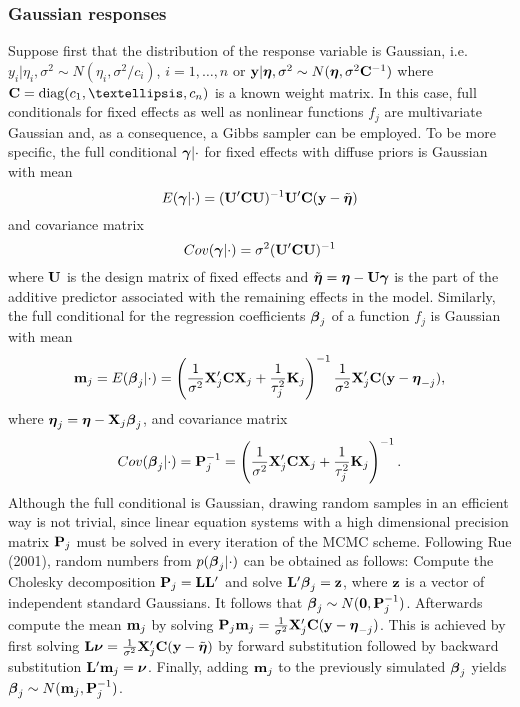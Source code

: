 \documentclass[11pt,a4paper,twoside]{bayesxarticle}
\begin{document}
\subsubsection{Gaussian responses}
\label{gaussianresp}

Suppose first that the distribution of the response variable is
Gaussian, i.e. $y_i | \eta_i, \sigma^2 \sim N(\eta_i,\sigma^2/c_i)$,
$i=1,\dots,n$ or $\mathbf{y} | \boldsymbol{\eta}, \sigma^2 \sim N(\boldsymbol{\eta},\sigma^2 \mathbf{C}^{-1})$
where $\Cvec = \diag(c_1,\dots,c_n)$ is a known weight matrix. In this
case, full conditionals for fixed effects as well as nonlinear
functions $f_j$ are multivariate Gaussian and, as a consequence, a
Gibbs sampler can be employed. To be more specific, the full
conditional $\boldsymbol{\gamma} | \cdot$ for fixed effects with diffuse priors
is Gaussian with mean
\begin{equation}\label{meanfixed}
 E(\gammavec | \cdot) = (\Uvec'\Cvec  \Uvec)^{-1}\Uvec'\Cvec(\yvec-\tilde{\etavec})
\end{equation}
and covariance matrix
\begin{equation}
\label{covfixed} Cov(\gammavec | \cdot ) = \sigma^2 (\Uvec'\Cvec \Uvec)^{-1}
\end{equation}
where $\mathbf{U}$ is the design matrix of fixed effects and
$\tilde{\boldsymbol{\eta}}=\boldsymbol{\eta}-\mathbf{U} \boldsymbol{\gamma}$ is the part of the additive predictor
associated with the remaining effects in the model. Similarly, the
full conditional for the regression coefficients $\boldsymbol{\beta}_j$ of a
function $f_j$ is Gaussian with mean
\begin{equation}
\label{meangaussian} \mvec_j = E(\betavec_j | \cdot) = \left(
\frac{1}{\sigma^2} \Xvec_j' \Cvec \Xvec_j + \frac{1}{\tau_j^2} \Kvec_j \right)^{-1}
\frac{1}{\sigma^2}\Xvec_j' \Cvec(\yvec-\etavec_{-j}),
\end{equation}
where $\boldsymbol{\eta}_j=\boldsymbol{\eta}-\mathbf{X}_j\boldsymbol{\beta}_j$, and covariance matrix
\begin{equation}
\label{covgaussian} Cov(\betavec_j | \cdot) = \Pvec_j^{-1} = \left(
\frac{1}{\sigma^2} \Xvec_j' \Cvec \Xvec_j + \frac{1}{\tau_j^2} \Kvec_j \right)^{-1}.
\end{equation}
Although the full conditional is Gaussian, drawing random samples in
an efficient way is not trivial, since linear equation systems with
a high dimensional precision matrix $\mathbf{P}_j$ must be solved in every
iteration of the MCMC scheme. Following Rue (2001), random numbers
from $p(\boldsymbol{\beta}_j | \cdot)$ can be obtained as follows: Compute the
Cholesky decomposition $\mathbf{P}_j = \mathbf{L} \mathbf{L}'$ and solve $\mathbf{L}' \boldsymbol{\beta}_j = \mathbf{z}$,
where $\mathbf{z}$ is a vector of independent standard Gaussians. It follows
that $\boldsymbol{\beta}_j \sim N(\boldsymbol{0},\mathbf{P}_j^{-1})$. Afterwards compute the mean $\mathbf{m}_j$
by solving $\mathbf{P}_j \mathbf{m}_j = \frac{1}{\sigma^2} \mathbf{X}_j'\mathbf{C}(\mathbf{y}-\boldsymbol{\eta}_{-j})$. This
is achieved by first solving $\mathbf{L} \boldsymbol{\nu} = \frac{1}{\sigma^2}
\mathbf{X}_j'\mathbf{C}(\mathbf{y}-\tilde{\boldsymbol{\eta}})$ by forward substitution followed by backward
substitution $\mathbf{L}' \mathbf{m}_j = \boldsymbol{\nu}$. Finally, adding $\mathbf{m}_j$ to the previously
simulated $\boldsymbol{\beta}_j$ yields $\boldsymbol{\beta}_j \sim N(\mathbf{m}_j,\mathbf{P}_j^{-1})$.
\end{document}

